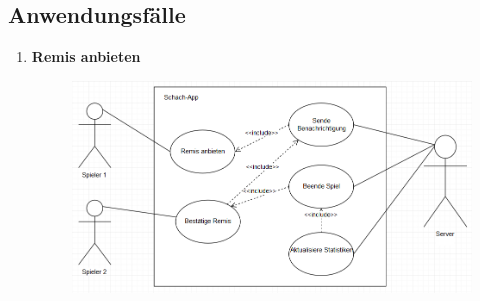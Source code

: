 \documentclass[parskip=full]{scrartcl}
\begin{document}
\subsection{Anwendungsfälle}
\begin{enumerate}
\item \textbf{Remis anbieten}
\begin{figure}
	\centering
	\includegraphics[width=0.7\linewidth]{Remis}
	\caption[Remis anbieten]{}
	\caption{}
	\label{fig:remis}
\end{figure}

\end{enumerate}
\end{document}
